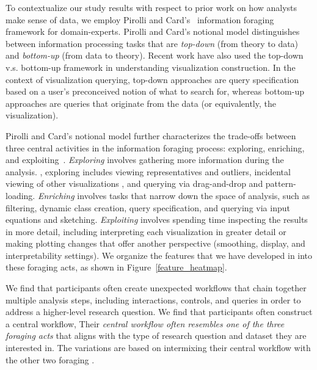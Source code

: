 \par To contextualize our study results with respect to prior work on how analysts make sense of data, we employ Pirolli and Card's~\cite{Pirolli} information foraging framework for domain-experts. Pirolli and Card's notional model distinguishes between information processing tasks that are \textit{top-down} (from theory to data) and \textit{bottom-up} (from data to theory). Recent work have also used the top-down v.s. bottom-up framework in understanding visualization construction\cite{Mendez2017}. In the context of visualization querying, top-down approaches are query specification based on a user's preconceived notion of what to search for, whereas bottom-up approaches are queries that originate from the data (or equivalently, the visualization).
\par Pirolli and Card's notional model further characterizes the trade-offs between three central activities in the information foraging process: exploring, enriching, and exploiting~\cite{Pirolli}. \textit{Exploring} involves gathering more information during the analysis. , exploring includes viewing representatives and outliers, incidental viewing of other visualizations , and querying via drag-and-drop and pattern-loading. \textit{Enriching} involves tasks that narrow down the space of analysis, such as filtering, dynamic class creation, query specification, and querying via input equations and sketching. \textit{Exploiting} involves spending time inspecting the results in more detail, including interpreting each visualization in greater detail or making plotting changes that offer another perspective (smoothing, display, and interpretability settings). We organize the features that we have developed in \zv into these foraging acts, as shown in Figure~\ref{feature_heatmap}.
\par We find that participants often create unexpected workflows that chain together multiple analysis steps, including interactions, controls, and queries in order to address a higher-level research question. We find that participants often construct a central workflow,  Their \emph{central workflow often resembles one of the three foraging acts} that aligns with the type of research question and dataset they are interested in. The variations are based on intermixing their central workflow with the other two foraging .
